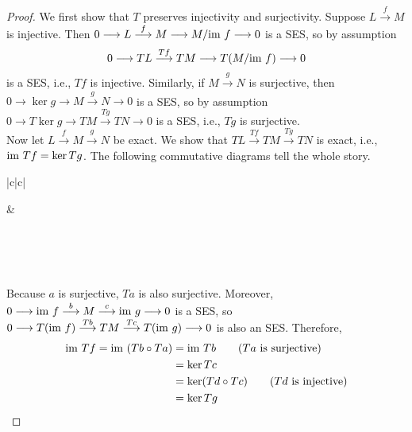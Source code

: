 \documentclass[11pt]{book}
\theoremstyle{definition}   \newtheorem{defn}[counter]{Definition} %
\newcommand{\mses}[5]{0 \longrightarrow #1 \overset{#2}{\longrightarrow} #3 \overset{#4}{\longrightarrow} #5 \longrightarrow 0}
\numberwithin{counter}{chapter}
\begin{document}
\begin{proof}
We first show that $T$ preserves injectivity and surjectivity. Suppose $L \overset{f}{\longrightarrow} M$ is injective. Then $\mses{L}{f}{M}{}{M/\im f}$ is a SES, so by assumption 
	\[\mses{T L}{Tf}{TM}{}{T (M/\im f)}\]
is a SES, i.e., $Tf$ is injective. Similarly, if $M \overset{g}{\longrightarrow} N$ is surjective, then $\mses{\ker g}{}{M}{g}{N}$ is a SES, so by assumption $\mses{T \ker g}{}{T M}{Tg}{TN}$ is a SES, i.e., $Tg$ is surjective. \\

Now let $L \overset{f}{\longrightarrow} M \overset{g}{\longrightarrow} N$ be exact. We show that $TL \overset{Tf}{\longrightarrow} TM \overset{Tg}{\longrightarrow} TN$ is exact, i.e., $\textnormal{im } Tf = \ker Tg$. The following commutative diagrams tell the whole story.


\begin{tabular}{|c|c|}

\hline
{\small {} } & 

{\small {} } \\
\hline
\end{tabular} \\ \ \\

Because $a$ is surjective, $Ta$ is also surjective. Moreover, $\mses{\im f}{b}{M}{c}{\im g}$ is a SES, so $\mses{T(\im f)}{Tb}{TM}{Tc}{T(\im g)}$ is also an SES. Therefore,
\begin{align*}
\textnormal{im } Tf = \textnormal{im }(Tb \circ Ta) &= \textnormal{im } Tb \tag{$Ta$ is surjective} \\
&= \ker Tc \\
&= \ker (Td \circ Tc) \tag{$Td$ is injective} \\
&= \ker Tg
\end{align*}
\end{proof}
\end{document}
